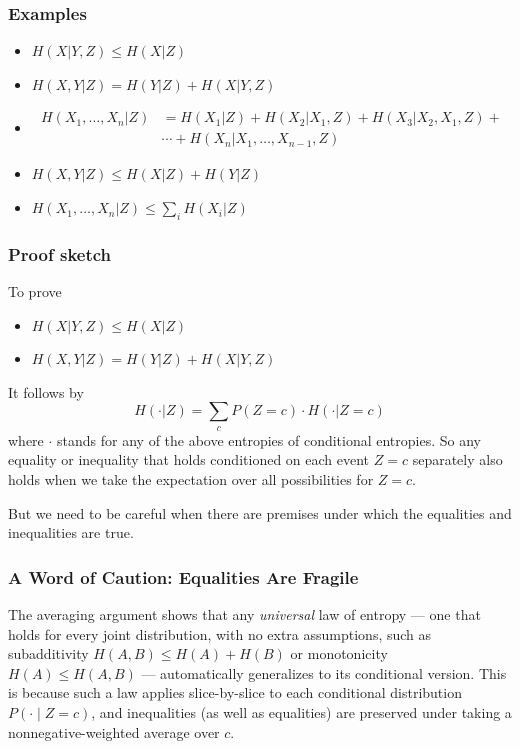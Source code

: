 \documentclass{article}
\begin{document}
\subsubsection{Examples}

\begin{itemize}
    \item $H(X|Y,Z)\leq H(X|Z)$
    \item $H(X,Y|Z) = H(Y|Z) + H(X|Y,Z)$
    \item \begin{align*}
        H(X_1,\ldots,X_n|Z)&= H(X_1|Z) + H(X_2|X_1, Z) + H(X_3|X_2,X_1,Z)+\\
        & \cdots + H(X_n|X_1,\ldots,X_{n-1},Z)
    \end{align*}
    \item $H(X,Y|Z) \leq H(X|Z) + H(Y|Z)$
    \item $H(X_1,\ldots, X_n| Z)\leq \sum_i H(X_i|Z)$
\end{itemize}

\subsubsection{Proof sketch}
To prove 
\begin{itemize}
    \item $H(X|Y,Z)\leq H(X|Z)$
    \item $H(X,Y|Z) = H(Y|Z) + H(X|Y,Z)$
\end{itemize}
It follows by 
\[
H(\cdot | Z) = \sum_c P(Z=c)\cdot H(\cdot | Z=c)
\]
where $\cdot$ stands for any of the above entropies of conditional entropies. So any equality or inequality that holds conditioned on each event $Z=c$ separately also holds when we take the expectation over all possibilities for $Z=c$.

But we need to be careful when there are premises under which the equalities and inequalities are true.

\subsubsection{A Word of Caution: Equalities Are Fragile}

The averaging argument shows that any \emph{universal} law of entropy --- one
that holds for every joint distribution, with no extra assumptions, such as
subadditivity $H(A,B)\leq H(A)+H(B)$ or monotonicity $H(A)\leq H(A,B)$ ---
automatically generalizes to its conditional version. This is because such a
law applies slice-by-slice to each conditional distribution $P(\cdot \mid Z=c)$,
and inequalities (as well as equalities) are preserved under taking a
nonnegative-weighted average over $c$.
\end{document}
